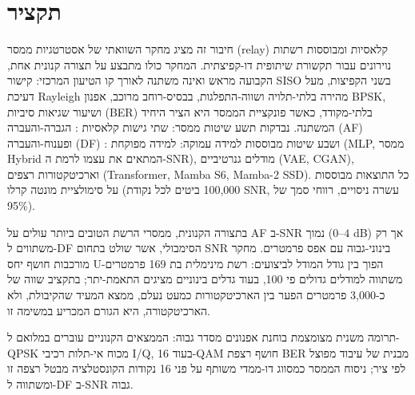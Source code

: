 \clearpage
\chapter*{\texthebrew{תקציר}}

\begin{otherlanguage}{hebrew}
\begin{flushright}
\label{sec:abstract-hebrew}


חיבור זה מציג מחקר השוואתי של אסטרטגיות ממסר (relay) קלאסיות ומבוססות רשתות נוירונים עבור תקשורת שיתופית דו-קפיצתית. המחקר כולו מתבצע על תצורה קנונית אחת, הקבועה מראש ואינה משתנה לאורך קו הטיעון המרכזי: קישור SISO בשני הקפיצות, מעל דעיכת Rayleigh מהירה בלתי-תלויה ושווה-התפלגות, בבסיס-רוחב מרוכב, אפנון BPSK, ושיעור שגיאות סיביות (BER) בלתי-מקודד, כאשר פונקציית הממסר היא הציר היחיד המשתנה. נבדקות תשע שיטות ממסר: שתי גישות קלאסיות : הגברה-והעברה (AF) ופענוח-והעברה (DF) : ושבע שיטות מבוססות למידה עמוקה: למידה מפוקחת (MLP, ממסר Hybrid המתאים את עצמו לרמת ה-SNR), מודלים גנרטיביים (VAE, CGAN), וארכיטקטורות רצפים (Transformer, Mamba S6, Mamba-2 SSD). כל התוצאות מבוססות על סימולציית מונטה קרלו (100,000 ביטים לכל נקודת SNR, עשרה ניסויים, רווחי סמך של 95\%).

בתצורה הקנונית, ממסרי הרשת הטובים ביותר עולים על AF ב-SNR נמוך ($0$–$4$ dB) אך רק משתווים ל-DF הסימבולי, אשר שולט בתחום SNR בינוני-גבוה עם אפס פרמטרים. מחקר מורכבות חושף יחס U-הפוך בין גודל המודל לביצועים: רשת מינימלית בת 169 פרמטרים משתווה למודלים גדולים פי 100, בעוד גדלים בינוניים מציגים התאמת-יתר; בתקציב שווה של כ-3,000 פרמטרים הפער בין הארכיטקטורות כמעט נעלם, ממצא המעיד שהקיבולת, ולא הארכיטקטורה, היא הגורם המכריע במשימה זו.

תרומה משנית מצומצמת בוחנת אפנונים מסדר גבוה: הממצאים הקנוניים עוברים במלואם ל-QPSK מכוח אי-תלות רכיבי I/Q, בעוד 16-QAM חושף רצפת BER מבנית של עיבוד מפוצל לפי ציר; ניסוח הממסר כמסווג דו-ממדי משותף על פני 16 נקודות הקונסטלציה מבטל רצפה זו ומשתווה ל-DF ב-SNR גבוה.


\end{flushright}
\end{otherlanguage}
